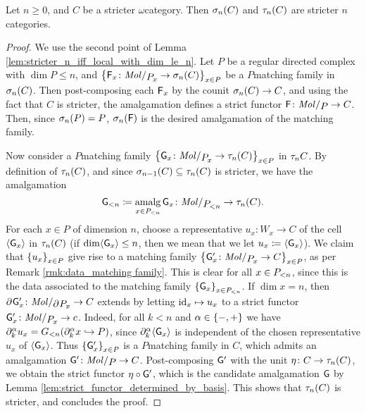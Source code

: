 \begin{lem} \label{lem:truncation_stricter_are_stricter}
    Let \( n \geq 0 \), and \( C \) be a stricter \( \omega \)\nbd category.
    Then \( \skel{n}(C) \) and \( \trunc{n}(C) \) are stricter \( n \)\nbd categories.
\end{lem}
\begin{proof}
    We use the second point of Lemma \ref{lem:stricter_n_iff_local_with_dim_le_n}.
    Let \( P \) be a regular directed complex with \( \dim P \le n \), and \( \set{\F_x \colon \molecin{\imel{P}{x}} \to \skel{n}(C)}_{x \in P} \) be a \( P \)\nbd matching family in \( \skel{n}(C) \).
    Then post-composing each \( \F_x \) by the counit \( \skel{n}(C) \to C \), and using the fact that \( C \) is stricter, the amalgamation defines a strict functor \( \F \colon \molecin{P} \to C \).
    Then, since \( \skel{n}(P) = P \), \( \skel{n}(\F) \) is the desired amalgamation of the matching family.

    Now consider a \( P \)\nbd matching family \( \set{\G_x \colon \molecin{\imel{P}{x}} \to \trunc{n}(C)}_{x \in P} \) in \( \trunc{n}C \).
    By definition of \( \trunc{n}(C) \), and since \( \skel{n - 1}(C) \subseteq \trunc{n}(C) \) is stricter, we have the amalgamation
    \begin{equation*}
        \gr{< n }{\G} \eqdef \amalg_{x \in \gr{< n}{P}} \G_x \colon \molecin{\gr{< n}{P}} \to \trunc{n}(C).
    \end{equation*}
    For each \( x \in P \) of dimension \( n \), choose a representative \( u_x \colon W_x \to C \) of the cell \( \pcell{\G_x} \) in \( \trunc{n}(C) \) (if \( \dim \pcell{\G_x} \le n \), then we mean that we let \( u_x \eqdef \pcell{\G_x} \)).
    We claim that \( \set{u_x}_{x \in P} \) give rise to a matching family \( \set{\G'_x \colon \molecin{\imel{P}{x}} \to C}_{x \in P} \), as per Remark \ref{rmk:data_matching family}.
    This is clear for all \( x \in \gr{< n}{P} \), since this is the data associated to the matching family \( \set{\G_x}_{x \in \gr{< n}{P}} \). 
    If \( \dim x = n \), then \( \bd{}{}\G'_x \colon \molecin{\bd{}{}\imel{P}{x}} \to C \) extends by letting \( \idd{x} \mapsto u_x \) to a strict functor \( \G'_x \colon \molecin{\imel{P}{x}} \to c \).
    Indeed, for all \( k < n \) and \( \a \in \set{-, +} \) we have \( \bd{k}{\a} u_x = \gr{< n}{G}(\bd{k}{\a} x \incl P ) \), since \( \bd{k}{\a} \pcell{\G_x} \) is independent of the chosen representative \( u_x \) of \( \pcell{\G_x} \).
    Thus \( \set{\G'_x}_{x \in P} \) is a \( P \)\nbd matching family in \( C \), which admits an amalgamation \( \G' \colon \molecin{P} \to C \). 
    Post-composing \( \G' \) with the unit \( \eta \colon C \to \trunc{n}(C) \), we obtain the strict functor \( \eta \after \G' \), which is the candidate amalgamation \( \G \) by Lemma \ref{lem:strict_functor_determined_by_basis}.
    This shows that \( \trunc{n}(C) \) is stricter, and concludes the proof.
\end{proof}

